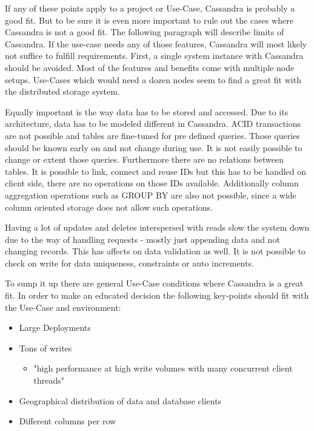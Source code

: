If any of these points apply to a project or Use-Case, Cassandra is probably a good fit.
But to be sure it is even more important to rule out the cases where Cassandra is not a good fit.
The following paragraph will describe limits of Cassandra. If the use-case needs any of those features, Cassandra will most likely not suffice to fulfill requirements.
First, a single system instance with Cassandra should be avoided. Most of the features and benefits come with multiple node setups. Use-Cases which would need a dozen nodes seem to find a great fit with the distributed storage system.

Equally important is the way data has to be stored and accessed. Due to its architecture, data has to be modeled different in Cassandra. ACID transactions are not possible and tables are fine-tuned for pre defined queries. Those queries should be known early on and not change during use. It is not easily possible to change or extent those queries. Furthermore there are no relations between tables. It is possible to link, connect and reuse IDs but this has to be handled on client side, there are no operations on those IDs available. Additionally column aggregation operations such as GROUP BY are also not possible, since a wide column oriented storage does not allow such operations.

Having a lot of updates and deletes interspersed with reads slow the system down due to the way of handling requests - mostly just appending data and not changing records. This has affects on data validation as well. It is not possible to check on write for data uniqueness, constraints or auto increments. \autocite{cassandra_oreilly}

To sump it up there are general Use-Case conditions where Cassandra is a great fit.
In order to make an educated decision the following key-points should fit with the Use-Case and environment:

\begin{itemize}
    \item Large Deployments
    \item Tons of writes
    \begin{itemize}
        \item{"high performance at high write volumes with many concurrent client threads"}
    \end{itemize}
    \item Geographical distribution of data and database clients
    \item Different columns per row
\end{itemize}


